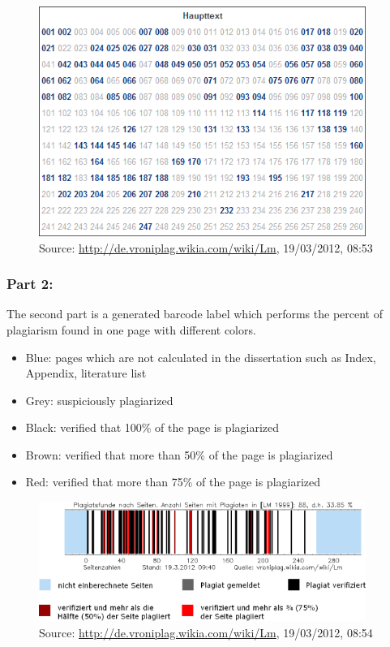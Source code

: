 \begin{figure}[!h]
  \centering
    \includegraphics[width=0.95\textwidth]{images/vroni-pages.png}
  \caption{Source: \url{http://de.vroniplag.wikia.com/wiki/Lm}, 19/03/2012, 08:53}
  \label{fig:vroniPages}
\end{figure}


\subsubsection{Part 2:} 

The second part is a generated barcode label which performs the percent of plagiarism found in one page with 
different colors.

\begin{itemize}
\item Blue: pages which are not calculated in the dissertation such as Index, Appendix, literature list
\item Grey: suspiciously plagiarized
\item Black: verified that 100\% of the page is plagiarized
\item Brown: verified that more than 50\% of the page is plagiarized
\item Red: verified that more than 75\% of the page is plagiarized
\end{itemize}

\begin{figure}[!h]
  \centering
    \includegraphics[width=0.95\textwidth]{images/vroni-barcode.png}
  \caption{Source: \url{http://de.vroniplag.wikia.com/wiki/Lm}, 19/03/2012, 08:54}
  \label{fig:vroniBarcode}
\end{figure}




